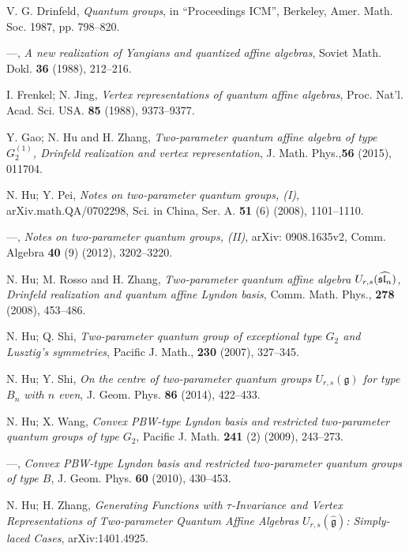 \documentclass{amsproc}
\theoremstyle{remark}
\numberwithin{equation}{section}
\begin{document}
\begin{thebibliography}{15}
 V. G. Drinfeld, \textit{Quantum groups}, in
``Proceedings ICM'', Berkeley, Amer. Math. Soc. 1987, pp. 798--820.

 ---, \textit{A new realization of Yangians and
quantized affine algebras}, Soviet Math. Dokl. \textbf {36} (1988),
212--216.

 I. Frenkel; N. Jing, \textit{Vertex representations of quantum affine algebras}, Proc. Nat'l. Acad. Sci.
USA. \textbf{85} (1988), 9373--9377.

 Y. Gao; N. Hu and H. Zhang,
\textit{Two-parameter quantum affine algebra of type $G_2^{(1)}$, Drinfeld realization and vertex representation}, J. Math. Phys.,{\bf 56} (2015), 011704.

 N. Hu; Y. Pei, \textit{Notes on two-parameter quantum groups, (I)},
arXiv.math.QA/0702298, Sci. in China, Ser. A. \textbf{51} (6)
(2008), 1101--1110.

 ---, \textit{Notes on two-parameter quantum groups,
(II)}, arXiv: 0908.1635v2, Comm. Algebra \textbf{40} (9) (2012), 3202--3220.

 N. Hu; M. Rosso and H. Zhang, \textit{Two-parameter quantum affine algebra
$U_{r,s}(\widehat{\frak{sl}_n})$, Drinfeld realization and quantum
affine Lyndon basis}, Comm. Math. Phys., \textbf{278} (2008),
453--486.

 N. Hu; Q. Shi, \textit{Two-parameter
quantum group of exceptional type $G_2$ and Lusztig's symmetries},
Pacific J. Math., \textbf{230} (2007), 327--345.

 N. Hu; Y. Shi, \textit{On the centre of two-parameter quantum groups $U_{r,s}(\mathfrak g)$ for type $B_n$ with $n$ even}, J. Geom. Phys.
 \textbf{86}  (2014), 422--433.

 N. Hu; X. Wang, \textit{Convex PBW-type Lyndon basis
and restricted two-parameter quantum groups of type $G_2$}, Pacific
J. Math. \textbf{241} (2) (2009), 243--273.

 ---, \textit{Convex PBW-type Lyndon basis
and restricted two-parameter quantum groups of type $B$}, J. Geom.
Phys. \textbf{60} (2010), 430--453.

 N. Hu; H. Zhang, \textit{Generating Functions with $\tau$-Invariance and Vertex Representations of Two-parameter Quantum Affine Algebras $U_{r,s}(\widehat{\mathfrak{g}})$:
 Simply-laced Cases}, arXiv:1401.4925.


\end{thebibliography}
\end{document}
